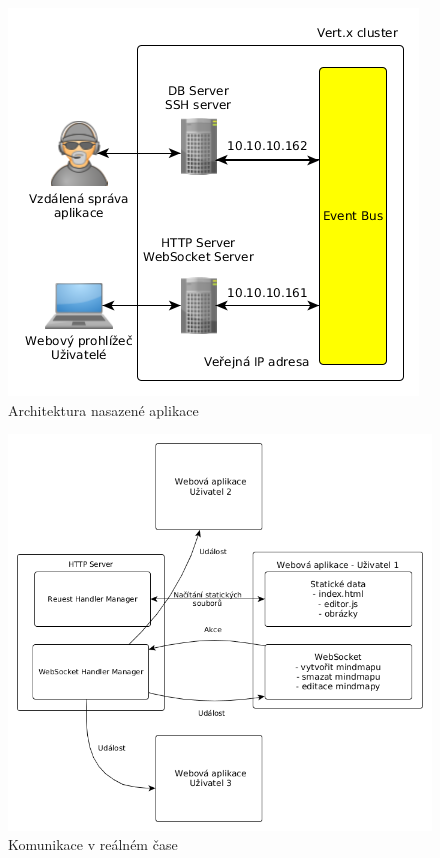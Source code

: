 \begin{figure}
\begin{centering}
\includegraphics[scale=0.5]{obrazky/architecture_real}
\par\end{centering}
\caption{Architektura nasazené aplikace\label{fig:architecture_real}}
\end{figure}

\begin{figure}
\begin{centering}
\includegraphics[width	=1\textwidth]{obrazky/realtime_communication}
\par\end{centering}
\caption{Komunikace v reálném čase\label{fig:realtime_communication}}
\end{figure}

